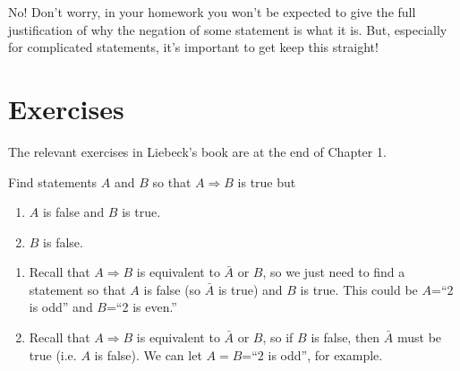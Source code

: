\documentclass[11pt,dvipsnames]{book}
\numberwithin{figure}{section} %
\numberwithin{table}{section} %
\begin{document}
 No! Don't worry, in your homework you won't be expected to give the full justification of why the negation of some statement is what it is. But, especially for complicated statements, it's important to get keep this straight!

\section{Exercises}%
\label{logicexercises}

The relevant exercises in Liebeck's book are at the end of Chapter 1.

\begin{exercise}
Find statements $A$ and $B$ so that $A\Rightarrow B$ is true but
\begin{enumerate}[label=(\alph*)]
\item $A$ is false and $B$ is true.
\item $B$ is false.
\end{enumerate}
\begin{solution}
\begin{enumerate}[label=(\alph*)]
\item
Recall that $A\Rightarrow B$ is equivalent to $\bar{A}$ or $B$, so we just need to find a statement so that $A$ is false (so $\bar{A}$ is true) and $B$ is true. This could be $A$=``2 is odd'' and $B$=``2 is even.''
\item Recall that $A\Rightarrow B$ is equivalent to $\bar{A}$ or $B$, so if $B$ is false, then $\bar{A}$ must be true (i.e. $A$ is false). We  can  let $A=B$=``2 is odd'', for example.
\end{enumerate}
\end{solution}
\end{exercise}
\end{document}
